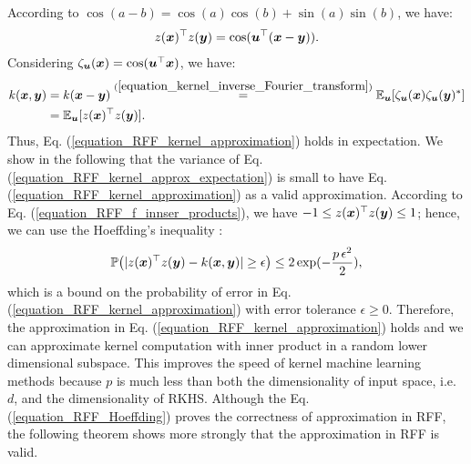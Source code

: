 \documentclass{article}
\def\b{\ensuremath\boldsymbol}
\begin{document}
According to $\cos(a-b) = \cos(a) \cos(b) + \sin(a) \sin(b)$, we have:
\begin{align}\label{equation_RFF_f_innser_products}
z(\b{x})^\top z(\b{y}) = \cos(\b{u}^\top (\b{x} - \b{y})).
\end{align}
Considering $\zeta_{\b{u}}(\b{x}) = \cos(\b{u}^\top \b{x})$, we have:
\begin{align}
k(\b{x}, \b{y}) &= k(\b{x} - \b{y}) \overset{(\ref{equation_kernel_inverse_Fourier_transform})}{=} \mathbb{E}_{\b{u}}[\zeta_{\b{u}}(\b{x}) \zeta_{\b{u}}(\b{y})^*] \nonumber \\
&= \mathbb{E}_{\b{u}}[z(\b{x})^\top z(\b{y})]. \label{equation_RFF_kernel_approx_expectation}
\end{align}
Thus, Eq. (\ref{equation_RFF_kernel_approximation}) holds in expectation. 
We show in the following that the variance of Eq. (\ref{equation_RFF_kernel_approx_expectation}) is small to have Eq. (\ref{equation_RFF_kernel_approximation}) as a valid approximation. 
According to Eq. (\ref{equation_RFF_f_innser_products}), we have $-1 \leq z(\b{x})^\top z(\b{y}) \leq 1$; hence, we can use the Hoeffding's inequality \cite{hoeffding1963probability}:
\begin{align}\label{equation_RFF_Hoeffding}
\mathbb{P}\big(|z(\b{x})^\top z(\b{y}) - k(\b{x}, \b{y})| \geq \epsilon\big) \leq 2 \exp(-\frac{p\,\epsilon^2}{2}),
\end{align}
which is a bound on the probability of error in Eq. (\ref{equation_RFF_kernel_approximation}) with error tolerance $\epsilon \geq 0$. 
Therefore, the approximation in Eq. (\ref{equation_RFF_kernel_approximation}) holds and we can approximate kernel computation with inner product in a random lower dimensional subspace. This improves the speed of kernel machine learning methods because $p$ is much less than both the dimensionality of input space, i.e. $d$, and the dimensionality of RKHS. 
Although the Eq. (\ref{equation_RFF_Hoeffding}) proves the correctness of approximation in RFF, the following theorem shows more strongly that the approximation in RFF is valid. 
\end{document}
